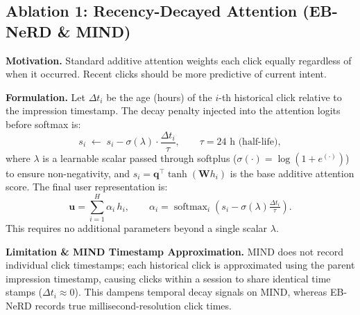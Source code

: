 \documentclass[11pt,a4paper]{article}
\begin{document}
\subsection{Ablation 1: Recency-Decayed Attention (EB-NeRD \& MIND)}
\label{sec:ablation_recency}

\textbf{Motivation.} Standard additive attention weights each click equally regardless of when it occurred. Recent clicks should be more predictive of current intent.

\textbf{Formulation.} Let $\Delta t_i$ be the age (hours) of the $i$-th historical click relative to the impression timestamp. The decay penalty injected into the attention logits before softmax is:
\[
  s_i \;\leftarrow\; s_i - \sigma(\lambda)\cdot\frac{\Delta t_i}{\tau}, \qquad \tau = 24\text{ h (half-life)},
\]
where $\lambda$ is a learnable scalar passed through softplus ($\sigma(\cdot){=}\log(1{+}e^{(\cdot)})$) to ensure non-negativity, and $s_i = \mathbf{q}^\top \tanh(\mathbf{W} h_i)$ is the base additive attention score. The final user representation is:
\[
  \mathbf{u} = \sum_{i=1}^{H} \alpha_i\, h_i, \qquad \alpha_i = \operatorname{softmax}_i\!\left(s_i - \sigma(\lambda)\tfrac{\Delta t_i}{\tau}\right).
\]
This requires no additional parameters beyond a single scalar $\lambda$.

\textbf{Limitation \& MIND Timestamp Approximation.} MIND does not record individual click timestamps; each historical click is approximated using the parent impression timestamp, causing clicks within a session to share identical time stamps ($\Delta t_i \approx 0$). This dampens temporal decay signals on MIND, whereas EB-NeRD records true millisecond-resolution click times.
\end{document}
